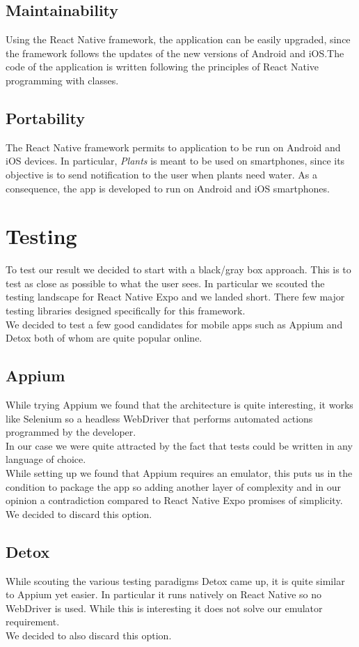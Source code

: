 \documentclass[10pt]{article}
\begin{document}
	\subsection{Maintainability}
	Using the React Native framework, the application can be easily upgraded, since the framework follows the updates of the new versions of Android and iOS.The code of the application is written following the principles of React Native programming with classes. 
	\subsection{Portability}
	The React Native framework permits to application to be run on Android and iOS devices. In particular, \textit{Plants} is meant to be used on smartphones, since its objective is to send notification to the user when plants need water. As a consequence, the app is developed to run on Android and iOS smartphones.
    
    \section{Testing}
    To test our result we decided to start with a black/gray box approach. This is to test as close as possible to what the user sees. In particular we scouted the testing landscape for React Native Expo and we landed short. There few major testing libraries designed specifically for this framework. \\
    We decided to test a few good candidates for mobile apps such as Appium and Detox both of whom are quite popular online.
    \subsection{Appium}
    While trying Appium we found that the architecture is quite interesting, it works like Selenium so a headless WebDriver that performs automated actions programmed by the developer. \\
    In our case we were quite attracted by the fact that tests could be written in any language of choice. \\
    While setting up we found that Appium requires an emulator, this puts us in the condition to package the app so adding another layer of complexity and in our opinion a contradiction compared to React Native Expo promises of simplicity. \\
    We decided to discard this option.
    \subsection{Detox}
    While scouting the various testing paradigms Detox came up, it is quite similar to Appium yet easier. In particular it runs natively on React Native so no WebDriver is used. While this is interesting it does not solve our emulator requirement. \\
    We decided to also discard this option.
\end{document}
